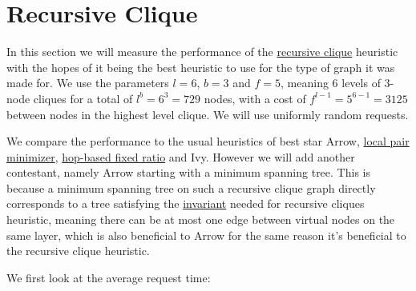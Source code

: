 \documentclass[a4paper, oneside]{discothesis}
\begin{document}
\section{Recursive Clique}

In this section we will measure the performance of the \hyperref[alg:reclique]{recursive clique} heuristic with the hopes of it being the best heuristic to use for the type of graph it was made for. We use the parameters $l=6$, $b=3$ and $f=5$, meaning 6 levels of 3-node cliques for a total of $l^b=6^3=729$ nodes, with a cost of $f^{l-1}=5^{6-1}=3125$ between nodes in the highest level clique. We will use uniformly random requests.

We compare the performance to the usual heuristics of best star Arrow, \hyperref[alg:lpm]{local pair minimizer}, \hyperref[alg:frh]{hop-based fixed ratio} and Ivy. However we will add another contestant, namely Arrow starting with a minimum spanning tree. This is because a minimum spanning tree on such a recursive clique graph directly corresponds to a tree satisfying the \hyperref[reclique-invariant]{invariant} needed for recursive cliques heuristic, meaning there can be at most one edge between virtual nodes on the same layer, which is also beneficial to Arrow for the same reason it's beneficial to the recursive clique heuristic.

We first look at the average request time:

\end{document}
